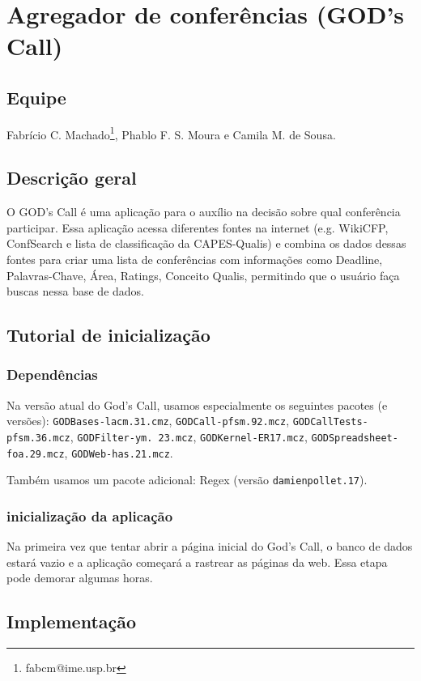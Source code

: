 \section{Agregador de conferências (GOD's Call)}
\subsection{Equipe}
	 Fabrício C. Machado\footnote{fabcm@ime.usp.br}, Phablo F. S. Moura e Camila M. de Sousa.

\subsection{Descrição geral}
  O GOD's Call é uma aplicação para o auxílio na decisão sobre qual conferência participar. 
  Essa aplicação acessa diferentes fontes na internet (e.g. WikiCFP, ConfSearch e lista de classificação da CAPES-Qualis) e combina os dados dessas fontes para criar uma lista de conferências com informações como Deadline, Palavras-Chave, Área, Ratings, Conceito Qualis, permitindo que o usuário faça buscas nessa base de dados.

\subsection{Tutorial de inicialização} %

\subsubsection{Dependências}

Na versão atual do God's Call, usamos especialmente os seguintes pacotes (e versões):
\texttt{GODBases-lacm.31.cmz}, \texttt{GODCall-pfsm.92.mcz}, \texttt{GODCallTests-pfsm.36.mcz}, \texttt{GODFilter-ym. 23.mcz}, \texttt{GODKernel-ER17.mcz}, \texttt{GODSpreadsheet-foa.29.mcz}, \texttt{GODWeb-has.21.mcz}.

Também usamos um pacote adicional: Regex (versão \texttt{damienpollet.17}).

\subsubsection{inicialização da aplicação}

Na primeira vez que tentar abrir a página inicial do God's Call, o banco de dados estará vazio e a aplicação começará a rastrear as páginas da web. Essa etapa pode demorar algumas horas. 

\subsection{Implementação}

